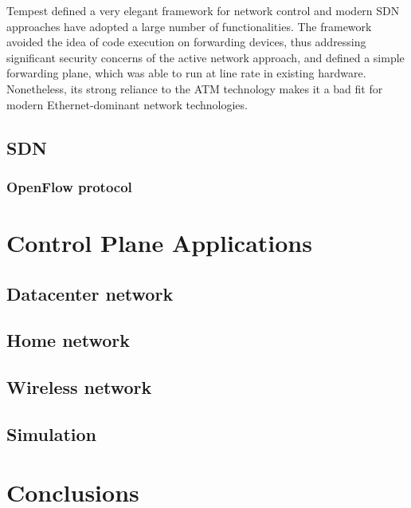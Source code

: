 Tempest defined a very elegant framework for network control and modern
SDN approaches have adopted a large number of functionalities. The framework
avoided the idea of code execution on forwarding devices, thus addressing
significant security concerns of the active network approach, and defined a
simple forwarding plane, which was able to run at line rate in existing
hardware. Nonetheless, its strong reliance to the ATM technology makes it a bad
fit for modern Ethernet-dominant network technologies. 

\subsection{SDN}


\subsubsection{OpenFlow protocol}

\section{Control Plane Applications} \label{sec:background:ofapp}
\subsection{Datacenter network}
\subsection{Home network}
\subsection{Wireless network}
\subsection{Simulation}

\section{Conclusions}
